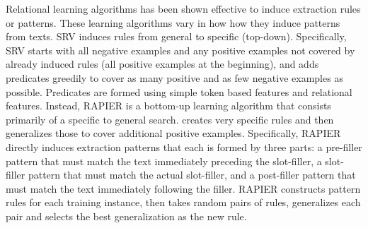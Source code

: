 Relational learning algorithms \cite{freitag-acl98,califf03} 
has been shown effective 
to induce extraction rules or patterns. 
These learning algorithms vary in how 
how they induce patterns from texts. 
SRV \cite{freitag-acl98} 
induces 
rules 
from general to specific (top-down). 
Specifically, SRV starts with 
all negative examples and 
any positive examples not covered by already induced 
rules (all positive examples at the beginning), 
and adds predicates greedily to 
cover as many positive and as few negative 
examples as possible. 
Predicates are formed using simple token based features 
and relational features. 
Instead, RAPIER \cite{califf03} is 
a bottom-up learning algorithm that 
consists 
primarily of a specific to general search. 
creates
very specific rules and then generalizes those to cover additional positive examples.
Specifically, RAPIER directly induces 
extraction patterns that 
each is formed by 
three parts:  
a pre-filler pattern that must match the text 
immediately preceding the slot-filler, 
a slot-filler pattern that must match the actual slot-filler, 
and a post-filler pattern that must match the text immediately
following the filler. 
RAPIER 
constructs pattern rules for
each training instance,   
then takes random pairs of rules, 
generalizes each pair and selects
the best generalization as the new rule.


